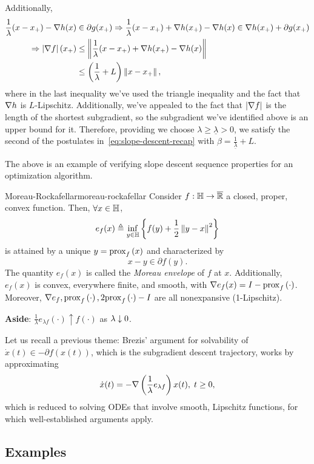 Additionally,
\begin{align*}
	\frac{1}{\lambda} (x - x_+) - \nabla h(x) &\in \partial g(x_+) \Rightarrow
	\frac{1}{\lambda} (x - x_+) + \nabla h(x_+) - \nabla h(x) \in \nabla h(x_+) +
	\partial g(x_+) \\
	\Rightarrow \left| \nabla f \right|(x_+) &\leq 
	\left \| \frac{1}{\lambda} (x - x_+) + \nabla h(x_+) - \nabla h(x) \right \| \\
	&\leq \left( \frac{1}{\lambda} + L \right) \left \| x - x_+ \right \|,
\end{align*}
where in the last inequality we've used the triangle inequality and the fact
that $\nabla h$ is $L$-Lipschitz. Additionally, we've appealed to the fact that
$\left| \nabla f \right|$ is the length of the shortest subgradient, so the subgradient
we've identified above is an upper bound for it.
Therefore, providing we choose $\lambda \geq
\underline{\lambda} > 0$, we satisfy the second of the postulates
in~\cref{eq:slope-descent-recap} with $\beta = \frac{1}{\underline{\lambda}} +
L$.

The above is an example of verifying slope descent sequence properties for an
optimization algorithm.


\begin{ctheorem}{Moreau-Rockafellar}{moreau-rockafellar}
	Consider $f: \mathbb{H} \to \overline{\mathbb{R}}$ a closed, proper, convex function.
	Then, $\forall x \in \mathbb{H}$,
	\[
		e_f(x) \triangleq \inf_{y \in \mathbb{H}} \left\{ f(y) + \frac{1}{2} \left \| y - x \right \|^2 \right\}
	\]
	is attained by a unique $y = \mathrm{prox}_{f}\left( x \right)$ and characterized by
	\[
		x - y \in \partial f(y).
	\]
	The quantity $e_f(x)$ is called the \textit{Moreau envelope} of $f$ at $x$.
	Additionally, $e_f(x)$ is convex, everywhere finite, and smooth, with
	$\nabla e_f (x) = I - \mathrm{prox}_{f}\left( \cdot \right)$. Moreover, $\nabla e_f, \mathrm{prox}_{f}\left( \cdot \right), 2
	\mathrm{prox}_{f}\left( \cdot \right) - I$ are all nonexpansive (1-Lipschitz).
\end{ctheorem}

\textbf{Aside}: $\frac{1}{\lambda} e_{\lambda f}(\cdot) \uparrow f(\cdot)$ as
$\lambda \downarrow 0$.

Let us recall a previous theme: Brezis' argument for solvability of $\dot{x}(t)
\in -\partial f(x(t))$, which is the subgradient descent trajectory, works by
approximating
\[
	\dot{x}(t) = -\nabla \left( \frac{1}{\lambda} e_{\lambda f} \right) x(t),
	\; t \geq 0,
\]
which is reduced to solving ODEs that involve smooth, Lipschitz functions, for
which well-established arguments apply.


\subsection{Examples}

